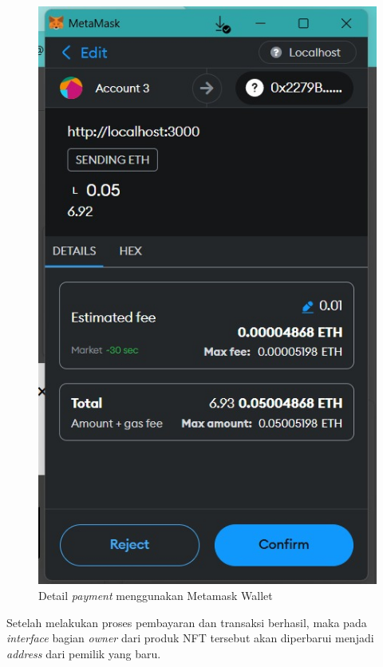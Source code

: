 \begin{figure} [H] \centering
  \includegraphics[scale=0.35]{gambar/transaction.jpeg}
  \caption{Detail \emph{payment} menggunakan Metamask Wallet}
  \label{fig:transaction}
\end{figure}

\vspace{-10pt}
Setelah melakukan proses pembayaran dan transaksi berhasil, maka pada \emph{interface} bagian \emph{owner} dari produk NFT tersebut akan diperbarui menjadi \emph{address} dari pemilik yang baru.

